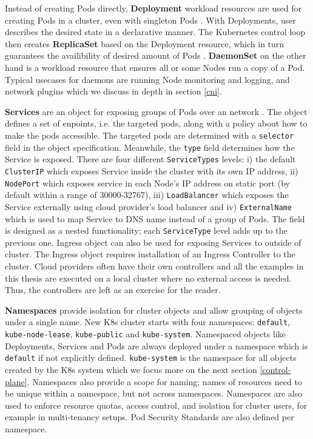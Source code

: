 \documentclass[english,12pt,a4paper,pdftex,sci,utf8]{aaltothesis}
\begin{document}
Instead of creating Pods directly, \textbf{Deployment} workload resources are used for creating Pods in a cluster, even with singleton Pods \cite{k8s-docs-pods}. With Deployments, user describes the desired state in a declarative manner. The Kubernetes control loop then creates \textbf{ReplicaSet} based on the Deployment resource, which in turn guarantees the availibility of desired amount of Pods \cite{k8s-docs-deployment}. \textbf{DaemonSet} on the other hand is a workload resource that ensures all or some Nodes run a copy of a Pod. Typical usecases for daemons are running Node monitoring and logging, and network plugins which we discuss in depth in section \ref{cni}.

\textbf{Services} are an object for exposing groups of Pods over an network \cite{k8s-docs-services}. The object defines a set of enpoints, i.e. the targeted pods, along with a policy about how to make the pods accessible. The targeted pods are determined with a \texttt{selector} field in the object specification. Meanwhile, the \texttt{type} field determines how the Service is exposed. There are four different \texttt{ServiceTypes} levels: i) the default \texttt{ClusterIP} which exposes Service inside the cluster with its own IP address, ii) \texttt{NodePort} which exposes service in each Node's IP address on static port (by default within a range of 30000-32767), iii) \texttt{LoadBalancer} which exposes the Service externally using cloud provider's load balancer and iv) \texttt{ExternalName} which is used to map Service to DNS name instead of a group of Pods. The field is designed as a nested functionality; each \texttt{ServiceType} level adds up to the previous one. Ingress object can also be used for exposing Services to outside of cluster. The Ingress object requires installation of an Ingress Controller to the cluster. Cloud providers often have their own controllers and all the examples in this thesis are executed on a local cluster where no external access is needed. Thus, the controllers are left as an exercise for the reader.

\textbf{Namespaces} provide isolation for cluster objects and allow grouping of objects under a single name. New K8s cluster starts with four namespaces: \texttt{default}, \texttt{kube-node-lease}, \texttt{kube-public} and \texttt{kube-system}. Namespaced objects like Deployments, Services and Pods are always deployed under a namespace which is \texttt{default} if not explicitly defined. \texttt{kube-system} is the namespace for all objects created by the K8s system which we focus more on the next section \ref{control-plane}. Namespaces also provide a scope for naming; names of resources need to be unique within a namespace, but not across namespaces. Namespaces are also used to enforce resource quotas, access control, and isolation for cluster users, for example in multi-tenancy setups. Pod Security Standards \cite{k8s-docs-pss} are also defined per namespace.
\end{document}
